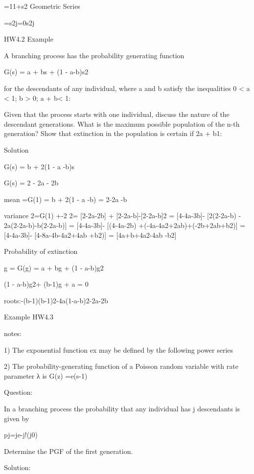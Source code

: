 	   =11+s2	     Geometric Series

	=s2j=0s2j	




HW4.2 Example
 
A branching process has the probability generating function
 
G(s) = a + bs + (1 - a-b)s2
 
for the descendants of any individual, where a and b satisfy the inequalities  0 < a < 1;    b > 0;    a + b< 1:
 
 

Given that the process starts with one individual, discuss the nature of the descendant generations. What is the maximum possible population of the n-th generation? Show that extinction in the population is certain if 2a + b1:
 
Solution
 
G(s) = b + 2(1 - a -b)s

G(s) = 2 - 2a - 2b
 
mean =G(1) = b + 2(1 - a -b) = 2-2a -b
 


variance  
    2=G(1) +-2
    2= [2-2a-2b] + [2-2a-b]-[2-2a-b]2
        = [4-4a-3b]- [2(2-2a-b) - 2a(2-2a-b)-b(2-2a-b)]
        = [4-4a-3b]- [(4-4a-2b) +(-4a-4a2+2ab)+(-2b+2ab+b2)]
        = [4-4a-3b]- [4-8a-4b-4a2+4ab +b2)]
        = [4a+b+4a2-4ab -b2]
 
Probability of extinction
 

g = G(g)    = a + bg + (1 - a-b)g2
 
(1 - a-b)g2+ (b-1)g + a = 0
 
 
roots:-(b-1)(b-1)2-4a(1-a-b)2-2a-2b




Example HW4.3
 
notes:
 
1) The exponential function ex may be defined by the following power series
 



  
2) The probability-generating function of a Poisson random variable with rate parameter λ is
  G(z) =e(s-1)
 
Question:

In a branching process the probability that any individual has j descendants is given by
 
 pj=je-j!(j0)

Determine the PGF of the first generation. 

Solution:


